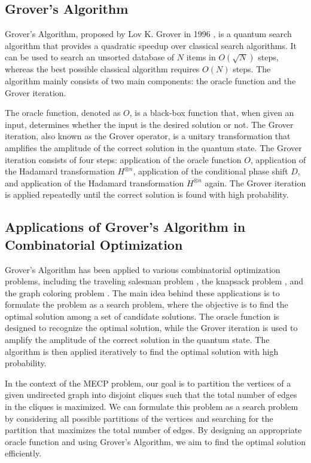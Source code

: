 \subsection{Grover's Algorithm}

Grover's Algorithm, proposed by Lov K. Grover in 1996 \cite{grover1996}, is a quantum search algorithm that provides a quadratic speedup over classical search algorithms. It can be used to search an unsorted database of $N$ items in $O(\sqrt{N})$ steps, whereas the best possible classical algorithm requires $O(N)$ steps. The algorithm mainly consists of two main components: the oracle function and the Grover iteration.

The oracle function, denoted as $O$, is a black-box function that, when given an input, determines whether the input is the desired solution or not. The Grover iteration, also known as the Grover operator, is a unitary transformation that amplifies the amplitude of the correct solution in the quantum state. The Grover iteration consists of four steps: application of the oracle function $O$, application of the Hadamard transformation $H^{\otimes n}$, application of the conditional phase shift $D$, and application of the Hadamard transformation $H^{\otimes n}$ again. The Grover iteration is applied repeatedly until the correct solution is found with high probability.

\subsection{Applications of Grover's Algorithm in Combinatorial Optimization}

Grover's Algorithm has been applied to various combinatorial optimization problems, including the traveling salesman problem \cite{tsp_grover}, the knapsack problem \cite{knapsack_grover}, and the graph coloring problem \cite{graph_coloring_grover}. The main idea behind these applications is to formulate the problem as a search problem, where the objective is to find the optimal solution among a set of candidate solutions. The oracle function is designed to recognize the optimal solution, while the Grover iteration is used to amplify the amplitude of the correct solution in the quantum state. The algorithm is then applied iteratively to find the optimal solution with high probability.

In the context of the MECP problem, our goal is to partition the vertices of a given undirected graph into disjoint cliques such that the total number of edges in the cliques is maximized. We can formulate this problem as a search problem by considering all possible partitions of the vertices and searching for the partition that maximizes the total number of edges. By designing an appropriate oracle function and using Grover's Algorithm, we aim to find the optimal solution efficiently.

